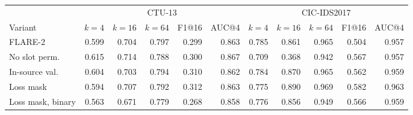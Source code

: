 \begin{tabular}{lrrrrrrrrrr}
\toprule
 & \multicolumn{5}{c}{CTU-13} & \multicolumn{5}{c}{CIC-IDS2017} \\
Variant & $k{=}4$ & $k{=}16$ & $k{=}64$ & F1@16 & AUC@4 & $k{=}4$ & $k{=}16$ & $k{=}64$ & F1@16 & AUC@4 \\
\midrule
FLARE-2 & 0.599 & 0.704 & 0.797 & 0.299 & 0.863 & 0.785 & 0.861 & 0.965 & 0.504 & 0.957 \\
No slot perm. & 0.615 & 0.714 & 0.788 & 0.300 & 0.867 & 0.709 & 0.368 & 0.942 & 0.567 & 0.957 \\
In-source val. & 0.604 & 0.703 & 0.794 & 0.310 & 0.862 & 0.784 & 0.870 & 0.965 & 0.562 & 0.959 \\
Loss mask & 0.594 & 0.707 & 0.792 & 0.312 & 0.863 & 0.775 & 0.890 & 0.969 & 0.582 & 0.963 \\
Loss mask, binary & 0.563 & 0.671 & 0.779 & 0.268 & 0.858 & 0.776 & 0.856 & 0.949 & 0.566 & 0.959 \\
\bottomrule
\end{tabular}
